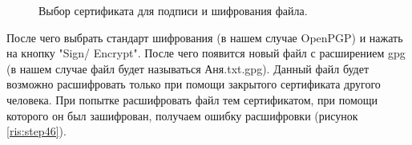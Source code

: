 \documentclass[10pt,a4paper]{report}
\begin{document}
\begin{figure}[h]
	\caption{Выбор сертификата для подписи и шифрования файла.}
	\label{ris:step45}
\end{figure}

После чего выбрать стандарт шифрования (в нашем случае OpenPGP) и нажать на кнопку "Sign/ Encrypt". После чего появится новый файл с расширением gpg (в нашем случае файл будет называться Аня.txt.gpg). Данный файл будет возможно расшифровать только при помощи закрытого сертификата другого человека. При попытке расшифровать файл тем сертификатом, при помощи которого он был зашифрован, получаем ошибку расшифровки (рисунок \ref{ris:step46}).
\end{document}
